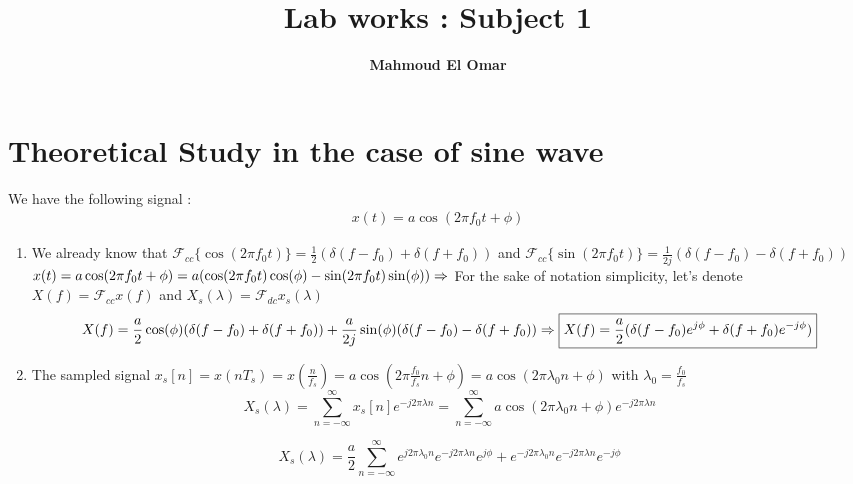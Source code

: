 \documentclass[14pt]{article}
\begin{document}
	\title{Lab works : Subject 1}
	\date{}
\author{\textbf{Mahmoud El Omar}}

\maketitle
{}
\section*{Theoretical Study in the case of sine wave}
We have the following signal :
\begin{align*}
	x(t) = a\cos(2\pi f_0t + \phi) 
\end{align*}
	\begin{enumerate}[label=\alph*)]
	 \item We already know that $\mathcal{F}_{cc}\{\cos(2\pi f_0t)\} = \frac{1}{2}(\delta (f-f_0) + \delta(f+f_0))$ and $\mathcal{F}_{cc}\{\sin(2\pi f_0t)\} = \frac{1}{2j}(\delta (f-f_0) - \delta(f+f_0))$ \break
	\newline
	 $x(t) = a\cos(2\pi f_0t + \phi) = a(\cos(2\pi f_0t)\cos(\phi) - \sin(2\pi f_0t)\sin(\phi)) \Rightarrow \newline 
	 \newline $For the sake of notation simplicity, let's denote $ \boxed{X(f) =  \mathcal{F}_{cc}x(f)}$ and $\boxed{X_s(\lambda) = \mathcal{F}_{dc}x_s(\lambda)}$ \newline \newline
	 \begin{equation*}
	 	X(f) = \frac{a}{2}\cos(\phi)(\delta (f-f_0) + \delta(f+f_0)) + \frac{a}{2j}\sin(\phi)(\delta (f-f_0) - \delta(f+f_0)) \Rightarrow \newline \newline
	  \boxed{X(f) = \frac{a}{2}(\delta(f-f_0)e^{j\phi} + \delta(f+f_0)e^{-j\phi})}
	 \end{equation*}

	  \item The sampled signal  $x_s[n] = x(nT_s) = x(\frac{n}{f_s}) = a\cos(2\pi \frac{f_0}{f_s}n + \phi) = a\cos(2\pi \lambda_0 n + \phi)$ with $\lambda_0 = \frac{f_0}{f_s}$
	  \begin{equation*}
	  	X_s(\lambda) = \sum_{n=-\infty}^{\infty} x_s[n]e^{-j2\pi \lambda n} = \sum_{n=-\infty}^{\infty} a\cos(2\pi \lambda_0 n+ \phi)e^{-j2\pi \lambda n}
	 \end{equation*}
	 
	 \begin{equation*}
	 X_s(\lambda) = \frac{a}{2}\sum_{n=-\infty}^{\infty}e^{j2\pi \lambda_0 n}e^{-j2\pi \lambda n}e^{j\phi} + e^{-j2\pi \lambda_0 n}e^{-j2\pi \lambda n}e^{-j\phi}
	 \end{equation*}
	

\end{enumerate}
\end{document}
